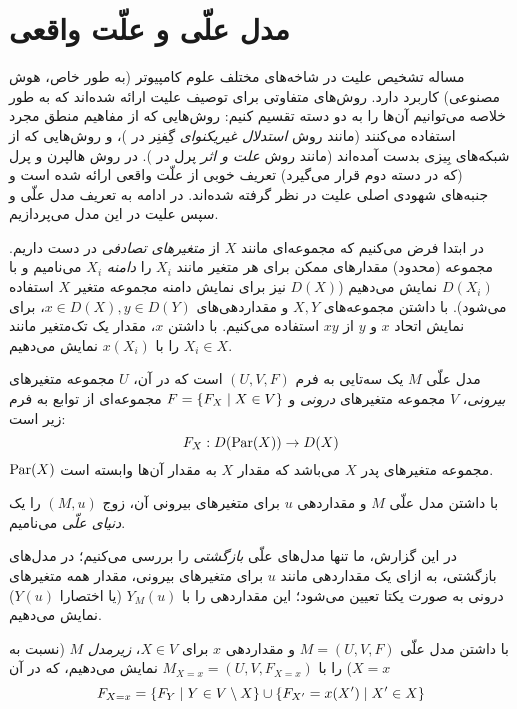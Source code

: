 \section{مدل علّی و علّت واقعی}\label{sec:causality}

مساله تشخیص علیت در شاخه‌های مختلف علوم کامپیوتر
(به طور خاص، هوش مصنوعی)
کاربرد دارد. روش‌های متفاوتی برای توصیف علیت ارائه شده‌اند
که به طور خلاصه می‌توانیم آن‌ها را به دو دسته تقسیم کنیم:
روش‌هایی که از مفاهیم منطق مجرد استفاده می‌کنند
(مانند روش
\textit{استدلال غیریکنوای}
گِفنِر در
\cite{geffner1990causal})،
و روش‌هایی که از شبکه‌های بِیزی بدست آمده‌اند
(مانند روش
\textit{علت و اثر}
پرل در
\cite{pearl1999reasoning}).
در روش هالپرن و پرل
(که در دسته دوم قرار می‌گیرد)
تعریف خوبی از علّت واقعی ارائه شده است و
جنبه‌های شهودی اصلی علیت در نظر گرفته شده‌اند.
در ادامه به تعریف مدل علّی
و سپس علیت در این مدل می‌پردازیم.

در ابتدا فرض می‌کنیم که مجموعه‌ای مانند
$X$
از
\textit{متغیرهای تصادفی}
در دست داریم.
مجموعه
(محدود)
مقدارهای ممکن برای هر متغیر مانند
$X_i$
را
\textit{دامنه} $X_i$
می‌نامیم و با
$D(X_i)$
نمایش می‌دهیم
($D(X)$
نیز برای نمایش دامنه مجموعه متغیر
$X$
استفاده می‌شود).
با داشتن مجموعه‌های
$X,Y$
و مقداردهی‌های
$x \in D(X), y \in D(Y)$،
برای نمایش اتحاد
$x$ و $y$
از
$xy$
استفاده می‌کنیم.
با داشتن
$x$،
مقدار یک تک‌متغیر
مانند
$X_i \in X$
را با
$x(X_i)$
نمایش می‌دهیم.

\begin{definition}\label{def:causal-model}
  مدل علّی
  $M$
  یک سه‌تایی به فرم
  $(U,V,F)$
  است که در آن،
  $U$
  مجموعه متغیرهای
  \textit{بیرونی}،
  $V$
  مجموعه متغیرهای
  \textit{درونی}
  و
  $F = \left\{ F_X \mid X \in V \right\}$
  مجموعه‌ای از توابع به فرم زیر است:
  \[ F_X: D(\operatorname{Par}(X)) \to D(X) \]
  $\operatorname{Par}(X)$
  مجموعه متغیرهای پدر
  $X$
  می‌باشد که مقدار
  $X$
  به مقدار آن‌ها وابسته است.
\end{definition}

\begin{definition}\label{def:causal-world}
  با داشتن مدل علّی
  $M$
  و مقداردهی
  $u$
  برای متغیرهای بیرونی آن،
  زوج
  $(M,u)$
  را یک
  \textit{دنیای علّی}
  می‌نامیم.
\end{definition}

در این گزارش، ما تنها مدل‌های علّی
\textit{بازگشتی}
را بررسی می‌کنیم؛ در مدل‌های بازگشتی،
به ازای یک مقداردهی مانند
$u$
برای متغیرهای بیرونی،
مقدار همه متغیرهای درونی
به صورت یکتا تعیین می‌شود؛
این مقداردهی را با
$Y_M(u)$ (یا اختصارا
$Y(u)$)
نمایش می‌دهیم.

\begin{definition}\label{def:causal-submodel}
  با داشتن مدل علّی
  $M=(U,V,F)$
  و مقداردهی
  $x$
  برای
  $X \in V$،
  \textit{زیرمدل} $M$
  (نسبت به
  $X=x$)
  را با
  $M_{X=x} = (U, V, F_{X=x})$
  نمایش می‌دهیم، که در آن
  \begin{equation*}
    F_{X=x} =
      \left\{ F_Y \mid Y \in V \setminus X \right\} \cup
      \left\{ F_{X'} = x(X') \mid X' \in X \right\}
  \end{equation*}
\end{definition}

